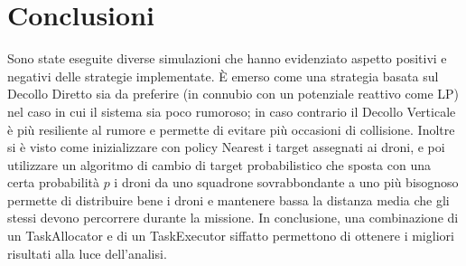 \documentclass[a4paper,11pt,oneside, table]{article}
\begin{document}
\section{Conclusioni}

Sono state eseguite diverse simulazioni che hanno evidenziato aspetto positivi e negativi delle strategie implementate.
\`E emerso come una strategia basata sul Decollo Diretto sia da preferire (in connubio con un potenziale reattivo come LP) nel caso in cui il sistema sia poco rumoroso; in caso contrario il Decollo Verticale \`e pi\`u resiliente al rumore e permette di evitare pi\`u occasioni di collisione.
Inoltre si \`e visto come inizializzare con policy Nearest i target assegnati ai droni, e poi utilizzare un algoritmo di cambio di target probabilistico che sposta con una certa probabilit\`a $p$ i droni da uno squadrone sovrabbondante a uno pi\`u bisognoso permette di distribuire bene i droni e mantenere bassa la distanza media che gli stessi devono percorrere durante la missione.
In conclusione, una combinazione di un TaskAllocator e di un TaskExecutor siffatto permettono di ottenere i migliori risultati alla luce dell'analisi.

\printbibliography[title={Bibliografia}]
\end{document}
